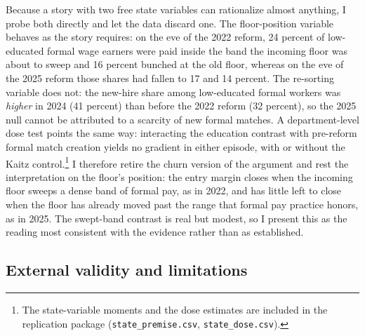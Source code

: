 Because a story with two free state variables can rationalize almost anything, I probe both directly and let the data discard one. The floor-position variable behaves as the story requires: on the eve of the 2022 reform, 24 percent of low-educated formal wage earners were paid inside the band the incoming floor was about to sweep and 16 percent bunched at the old floor, whereas on the eve of the 2025 reform those shares had fallen to 17 and 14 percent. The re-sorting variable does not: the new-hire share among low-educated formal workers was \emph{higher} in 2024 (41 percent) than before the 2022 reform (32 percent), so the 2025 null cannot be attributed to a scarcity of new formal matches. A department-level dose test points the same way: interacting the education contrast with pre-reform formal match creation yields no gradient in either episode, with or without the Kaitz control.\footnote{The state-variable moments and the dose estimates are included in the replication package (\texttt{state\_premise.csv}, \texttt{state\_dose.csv}).} I therefore retire the churn version of the argument and rest the interpretation on the floor's position: the entry margin closes when the incoming floor sweeps a dense band of formal pay, as in 2022, and has little left to close when the floor has already moved past the range that formal pay practice honors, as in 2025. The swept-band contrast is real but modest, so I present this as the reading most consistent with the evidence rather than as established.

\subsection{External validity and limitations}

